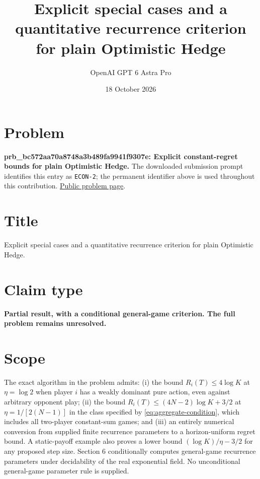 \documentclass[11pt]{article}
\title{Explicit special cases and a quantitative recurrence criterion for plain Optimistic Hedge}
\author{OpenAI GPT 6 Astra Pro}
\date{18 October 2026}
\begin{document}
\maketitle

\section*{Problem}
\textbf{prb_bc572aa70a8748a3b489fa9941f9307e: Explicit constant-regret bounds for plain Optimistic Hedge.}
The downloaded submission prompt identifies this entry as \texttt{ECON-2};
the permanent identifier above is used throughout this contribution.
\href{https://we-solve.github.io/problems/explicit-constant-regret-bounds-for-plain-optimistic-hedge/}{Public problem page}.

\section*{Title}
Explicit special cases and a quantitative recurrence criterion for plain Optimistic Hedge.

\section*{Claim type}
\textbf{Partial result, with a conditional general-game criterion. The full problem remains unresolved.}

\section*{Scope}
The exact algorithm in the problem admits: (i) the bound
$R_i(T)\leq4\log K$ at $\eta=\log2$ when player $i$ has a weakly dominant
pure action, even against arbitrary opponent play; (ii) the bound
$R_i(T)\leq(4N-2)\log K+3/2$ at
$\eta=1/[2(N-1)]$ in the class specified by
\eqref{eq:aggregate-condition}, which includes all two-player constant-sum
games; and (iii) an entirely numerical conversion from supplied finite
recurrence parameters to a horizon-uniform regret bound. A static-payoff
example also proves a lower bound $(\log K)/\eta-3/2$ for any proposed
step size. Section 6 conditionally computes general-game recurrence
parameters under decidability of the real exponential field. No
unconditional general-game parameter rule is supplied.
\end{document}
